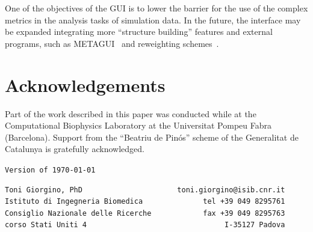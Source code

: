 \documentclass[preprint,review,11pt]{elsarticle}
\begin{document}
One of the objectives of the GUI is to lower the barrier for the use
of the complex metrics in the analysis tasks of simulation data. In
the future, the interface may be expanded integrating more ``structure
building'' features and external programs, such as
METAGUI~\cite{Biarnes_Pietrucci_Marinelli_Laio_2012} and reweighting
schemes~\cite{Bonomi_Barducci_Parrinello_2009}.





\section{Acknowledgements}

Part of the work described in this paper was conducted while at the
Computational Biophysics Laboratory at the Universitat Pompeu Fabra
(Barcelona). Support from the ``Beatriu de Pin\'os'' scheme
of the Generalitat de Catalunya is gratefully acknowledged.







\vspace{2cm}

\texttt{Version of \longdate \today \, \currenttime}
\begin{verbatim}
Toni Giorgino, PhD                      toni.giorgino@isib.cnr.it
Istituto di Ingegneria Biomedica              tel +39 049 8295761
Consiglio Nazionale delle Ricerche            fax +39 049 8295763
corso Stati Uniti 4                                I-35127 Padova
\end{verbatim}
\end{document}
